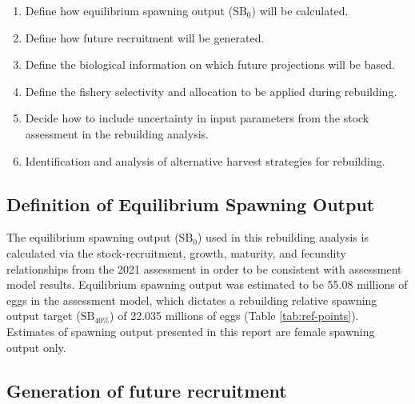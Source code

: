 \documentclass[11pt,
  english,
  a4paper,
]{article}
\begin{document}
\begin{enumerate}
    \item Define how equilibrium spawning output ($\text{SB}_0$) will be calculated. 
    \item Define how future recruitment will be generated.
    \item Define the biological information on which future projections will be based.
    \item Define the fishery selectivity and allocation to be applied during rebuilding. 
    \item Decide how to include uncertainty in input parameters from the stock assessment in the rebuilding analysis. 
    \item Identification and analysis of alternative harvest strategies for rebuilding. 
\end{enumerate}


\hypertarget{definition-of-equilibrium-spawning-output}{%
\subsection{Definition of Equilibrium Spawning Output}\label{definition-of-equilibrium-spawning-output}}

\leavevmode\tagmcend\tagstructend


The equilibrium spawning output ({\(\text{SB}_0\)\leavevmode\tagmcend\tagstructend}) used in this rebuilding analysis is calculated via the stock-recruitment, growth, maturity, and fecundity relationships from the 2021 assessment in order to be consistent with assessment model results. Equilibrium spawning output was estimated to be 55.08 millions of eggs in the assessment model, which dictates a rebuilding relative spawning output target ({\(\text{SB}_{40\%}\)\leavevmode\tagmcend\tagstructend}) of 22.035 millions of eggs (Table \ref{tab:ref-points}). Estimates of spawning output presented in this report are female spawning output only.

\leavevmode\tagmcend\tagstructend\par


\hypertarget{generation-of-future-recruitment}{%
\subsection{Generation of future recruitment}\label{generation-of-future-recruitment}}
\end{document}
